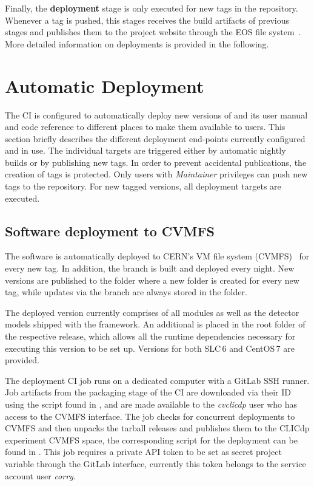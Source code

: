 Finally, the \textbf{deployment} stage is only executed for new tags in the repository.
Whenever a tag is pushed, this stages receives the build artifacts of previous stages and publishes them to the \corry project website through the EOS file system~\cite{eos}. More detailed information on deployments is provided in the following.

\section{Automatic Deployment}

The CI is configured to automatically deploy new versions of \corry and its user manual and code reference to different places to make them available to users.
This section briefly describes the different deployment end-points currently configured and in use.
The individual targets are triggered either by automatic nightly builds or by publishing new tags.
In order to prevent accidental publications, the creation of tags is protected.
Only users with \emph{Maintainer} privileges can push new tags to the repository.
For new tagged versions, all deployment targets are executed.

\subsection{Software deployment to CVMFS}
\label{sec:cvmfs}

The software is automatically deployed to CERN's VM file system (CVMFS)~\cite{cvmfs} for every new tag.
In addition, the  branch is built and deployed every night.
New versions are published to the folder  where a new folder is created for every new tag, while updates via the  branch are always stored in the  folder.

The deployed version currently comprises of all modules as well as the detector models shipped with the framework.
An additional  is placed in the root folder of the respective release, which allows all the runtime dependencies necessary for executing this version to be set up.
Versions for both SLC\,6 and CentOS\,7 are provided.

The deployment CI job runs on a dedicated computer with a GitLab SSH runner.
Job artifacts from the packaging stage of the CI are downloaded via their ID using the script found in , and are made available to the \emph{cvclicdp} user who has access to the CVMFS interface.
The job checks for concurrent deployments to CVMFS and then unpacks the tarball releases and publishes them to the CLICdp experiment CVMFS space, the corresponding script for the deployment can be found in .
This job requires a private API token to be set as secret project variable through the GitLab interface, currently this token belongs to the service account user \emph{corry}.

